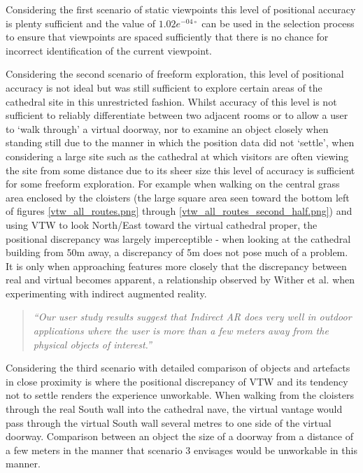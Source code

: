 Considering the first scenario of static viewpoints this level of positional accuracy is plenty sufficient and the value of $1.02e^{-04\circ}$ can be used in the selection process to ensure that viewpoints are spaced sufficiently that there is no chance for incorrect identification of the current viewpoint.

Considering the second scenario of freeform exploration, this level of positional accuracy is not ideal but was still sufficient to explore certain areas of the cathedral site in this unrestricted fashion. Whilst accuracy of this level is not sufficient to reliably differentiate between two adjacent rooms or to allow a user to `walk through' a virtual doorway, nor to examine an object closely when standing still due to the manner in which the position data did not `settle', when considering a large site such as the cathedral at which visitors are often viewing the site from some distance due to its sheer size this level of accuracy is sufficient for some freeform exploration. For example when walking on the central grass area enclosed by the cloisters (the large square area seen toward the bottom left of figures \ref{vtw_all_routes.png} through \ref{vtw_all_routes_second_half.png}) and using VTW to look North/East toward the virtual cathedral proper, the positional discrepancy was largely imperceptible - when looking at the cathedral building from 50m away, a discrepancy of 5m does not pose much of a problem. It is only when approaching features more closely that the discrepancy between real and virtual becomes apparent, a relationship observed by Wither et al. when experimenting with indirect augmented reality.

\begin{quote}
	\textit{``Our user study results suggest that Indirect AR does very well in outdoor applications where the user is more than a few meters away from the physical objects of interest.''}~\cite{Wither2011}
\end{quote}

Considering the third scenario with detailed comparison of objects and artefacts in close proximity is where the positional discrepancy of VTW and its tendency not to settle renders the experience unworkable. When walking from the cloisters through the real South wall into the cathedral nave, the virtual vantage would pass through the virtual South wall several metres to one side of the virtual doorway. Comparison between an object the size of a doorway from a distance of a few meters in the manner that scenario 3 envisages would be unworkable in this manner.


